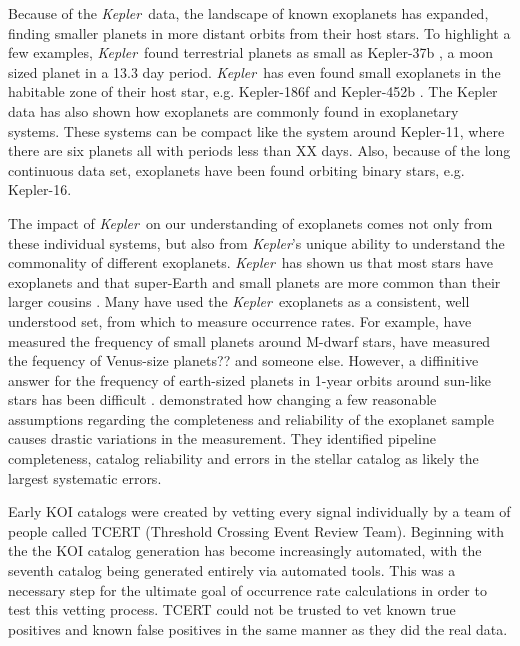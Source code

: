 \documentclass[onecolumn]{aastex6}
\newcommand\Kepler{\textit{Kepler}}
\begin{document}
Because of the \Kepler\ data, the landscape of known exoplanets has expanded, finding smaller planets in more distant orbits from their host stars.  To highlight a few examples,  \Kepler\ found terrestrial planets as small as Kepler-37b \citep{Barclay2013}, a moon sized planet in a 13.3 day period. \Kepler\ has even found small exoplanets in the habitable zone of their host star, e.g. Kepler-186f \citep{Quintana2014} and Kepler-452b \citep{Jenkins2015}.  The Kepler data has also shown how exoplanets are commonly found in exoplanetary systems. These systems can be compact like the system around Kepler-11, where there are six planets all with periods less than XX days. Also, because of the long continuous data set, exoplanets have been found orbiting binary stars, e.g. Kepler-16\citep{Doyle2011}.

The impact of \Kepler\ on our understanding of exoplanets comes not only from these individual systems, but also from \Kepler's unique ability to understand the commonality of different exoplanets.  \Kepler\ has shown us that most stars have exoplanets and that super-Earth and small planets are more common than their larger cousins \citet{Burke2015}. Many have used the \Kepler\ exoplanets as a consistent, well understood set, from which to measure occurrence rates. For example, \citep{Dressing2015} have measured the frequency of small planets around M-dwarf stars, \citep{Kane2014} have measured the fequency of Venus-size planets?? and someone else.   However, a diffinitive answer for the frequency of earth-sized planets in 1-year orbits around sun-like stars has been difficult \citep{petigura2014;burke2015;Fressin2015}. \citet{Burke2015} demonstrated how changing a few reasonable assumptions regarding the completeness and reliability of the exoplanet sample causes drastic variations in the measurement.  They identified pipeline completeness, catalog reliability and errors in the stellar catalog as likely the largest systematic errors.

Early KOI catalogs  were created by vetting every signal individually by a team of people called TCERT (Threshold Crossing Event Review Team). Beginning with the \citet{Mullally2015} the KOI catalog generation has become increasingly automated, with the seventh catalog \citep[][DR24 KOI catalog]{Coughlin2016} being generated entirely via automated tools.  This was a necessary step for the ultimate goal of occurrence rate calculations in order to test this vetting process. TCERT could not be trusted to vet known true positives and known false positives in the same manner as they did the real data.  
\end{document}

